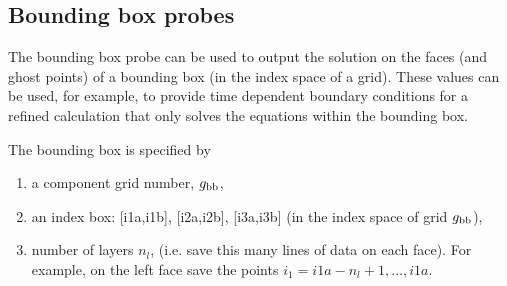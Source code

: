 \subsection{Bounding box probes} \label{sec:boundingBoxProbes}

The bounding box probe can be used to output the solution on the faces (and ghost points) of a bounding
box (in the index space of a grid). These values can be used, for example, to provide 
time dependent boundary conditions for a refined calculation that only solves the equations within the
bounding box.

The bounding box is specified by 
\begin{enumerate}
  \item a component grid number, $g_{\rm bb}$, 
  \item an index box: [i1a,i1b], [i2a,i2b], [i3a,i3b] (in the index space of grid $g_{\rm bb}$), 
  \item number of layers $n_l$, (i.e. save this many lines of data on each face). For example, on the left
   face save the points $i_1=i1a-n_l+1,\ldots,i1a$.
\end{enumerate}

